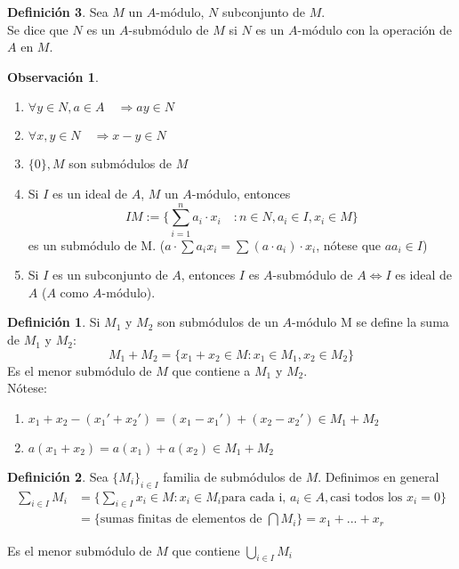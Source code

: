 \documentclass{article}
\theoremstyle{theorem-style}  %
\theoremstyle{definition}
\newtheorem{definition}{Definición}[section]
\newtheorem*{observation}{Observación} %
\theoremstyle{example-style}
\begin{document}
\begin{definition}
	Sea $M$ un $A$-módulo, $N$ subconjunto de $M$.\\
	Se dice que $N$ es un $A$-submódulo de $M$ si $N$ es un $A$-módulo con la operación de $A$ en $M$.
	\begin{observation}
		\
		\begin{enumerate}
			\item $ \forall y \in N, a \in A \quad\Rightarrow ay\in N$
			\item $\forall x,y\in N  \quad \Rightarrow x-y \in N$
			\item $\{0\}, M$ son submódulos de $M$
			\item Si $I$ es un ideal de $A$, $M$ un $A$-módulo, entonces
			\[IM:=\{ \sum_{i=1}^{n} a_i\cdot x_i \quad : n \in N, a_i \in I, x_i \in M\}\]
			es un submódulo de M. ($a \cdot \sum a_i x_i = \sum (a\cdot a_i) \cdot x_i$, nótese que $aa_i\in I$)

			\item Si $I$ es un subconjunto de $A$, entonces $ I $ es $ A $-submódulo de $ A \Leftrightarrow I $ es ideal de $ A $ ($ A $ como $ A $-módulo).
		\end{enumerate}
	\end{observation}
		\begin{definition}
			Si $ M_1 $ y $ M_2 $ son submódulos de un $ A $-módulo M se define la suma de $M_1 $ y $ M_2$:
			\[ M_1+M_2 = \{x_1+x_2 \in M : x_1\in M_1, x_2 \in M_2\}\]
			Es el menor submódulo de $ M $ que contiene a $ M_1 $ y $ M_2 $.\\
			Nótese:
			\begin{enumerate}
				\item $ x_1+x_2-(x_1'+x_2') = (x_1-x_1')+ (x_2-x_2') \in M_1+M_2 $
				\item $ a(x_1+x_2)=a(x_1)+a(x_2)\in M_1+M_2 $
			\end{enumerate}
		\end{definition}

	\begin{definition}
		Sea $ \{M_i\}_{i\in I} $ familia de submódulos de $ M $. Definimos en general
		\begin{align*}
			\sum_{i\in I}M_i &= \{\sum_{i\in I}x_i \in M : x_i\in M_i \text{para cada i, }a_i\in A, \text{casi todos los }x_i=0\}\\
			&= \{\text{sumas finitas de elementos de }\bigcap M_i\}=x_1+...+x_r
		\end{align*}

		Es el menor submódulo de $ M $ que contiene $ \bigcup_{i\in I} M_i $
	\end{definition}

\end{definition}
\end{document}
